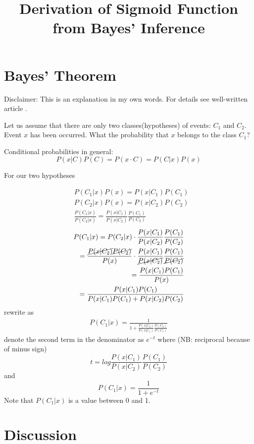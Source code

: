 \documentclass[english, 12pt]{article}
\begin{document}
\title{Derivation of Sigmoid Function from Bayes' Inference}

\maketitle

\section{Bayes' Theorem}

Disclaimer: This is an explanation in my own words. 
For details see well-written article \cite{Renals2014}.

Let us assume that there are only two classes(hypotheses) of events: $C_1$ and $C_2$. 
Event $x$ has been occurred. 
What the probability that $x$ belongs to the class $C_1$?

Conditional probabilities in general:
$$
P(x|C) P(C) = P(x \cdot C) = P(C|x)P(x) 
$$

For our two hypotheses

\begin{align*}
& P(C_1|x)P(x) = P(x|C_1)P(C_1) \\
& P(C_2|x)P(x) = P(x|C_2)P(C_2) \\
%
& \frac{P(C_1|x)}{P(C_2|x)} = \frac{P(x|C_1)}{P(x|C_2)}
\frac{P(C_1)}{P(C_2)}
\end{align*}
%
\begin{align*}
P(C_1|x) = P(C_2|x) \cdot
\frac{P(x|C_1)}{P(x|C_2)} \frac{P(C_1)}{P(C_2)} \\
= \frac{\cancel{P(x|C_2)}\cancel{P(C_2)}}{P(x)} \cdot
\frac{P(x|C_1)}{\cancel{P(x|C_2)}} \frac{P(C_1)}{\cancel{P(C_2)}} \\
= \frac{P(x|C_1)P(C_1)}{P(x)} \\
= \frac{P(x|C_1)P(C_1)}{P(x|C_1)P(C_1) + P(x|C_2)P(C_2)}
\end{align*}
%
rewrite as
%
\begin{align*}
P(C_1|x) = \frac1{1 + \frac{P(x|C_2)}{P(x|C_1)}
    \frac{P(C_2)}{P(C_1)}}
\end{align*}
%
denote the second term in the denominator as $e^{-t}$ where 
(NB: reciprocal because of minus sign)
$$
t = log \frac{P(x|C_1)}{P(x|C_2)} \frac{P(C_1)}{P(C_2)}
$$
%
and
%
$$
P(C_1|x) = \frac1{1 + e^{-t}}
$$
Note that $P(C_1|x)$ is a value between 0 and 1.

\section{Discussion}
\end{document}
